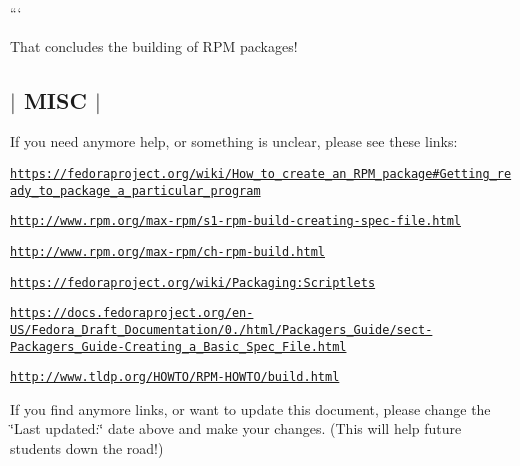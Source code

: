 ```

That concludes the building of R\-P\-M packages! 

 \subsection*{$\vert$ M\-I\-S\-C $\vert$ }

If you need anymore help, or something is unclear, please see these links\-:

\href{https://fedoraproject.org/wiki/How_to_create_an_RPM_package#Getting_ready_to_package_a_particular_program}{\tt https\-://fedoraproject.\-org/wiki/\-How\-\_\-to\-\_\-create\-\_\-an\-\_\-\-R\-P\-M\-\_\-package\#\-Getting\-\_\-ready\-\_\-to\-\_\-package\-\_\-a\-\_\-particular\-\_\-program}

\href{http://www.rpm.org/max-rpm/s1-rpm-build-creating-spec-file.html}{\tt http\-://www.\-rpm.\-org/max-\/rpm/s1-\/rpm-\/build-\/creating-\/spec-\/file.\-html}

\href{http://www.rpm.org/max-rpm/ch-rpm-build.html}{\tt http\-://www.\-rpm.\-org/max-\/rpm/ch-\/rpm-\/build.\-html}

\href{https://fedoraproject.org/wiki/Packaging:Scriptlets}{\tt https\-://fedoraproject.\-org/wiki/\-Packaging\-:\-Scriptlets}

\href{https://docs.fedoraproject.org/en-US/Fedora_Draft_Documentation/0.1/html/Packagers_Guide/sect-Packagers_Guide-Creating_a_Basic_Spec_File.html}{\tt https\-://docs.\-fedoraproject.\-org/en-\/\-U\-S/\-Fedora\-\_\-\-Draft\-\_\-\-Documentation/0./html/\-Packagers\-\_\-\-Guide/sect-\/\-Packagers\-\_\-\-Guide-\/\-Creating\-\_\-a\-\_\-\-Basic\-\_\-\-Spec\-\_\-\-File.\-html}

\href{http://www.tldp.org/HOWTO/RPM-HOWTO/build.html}{\tt http\-://www.\-tldp.\-org/\-H\-O\-W\-T\-O/\-R\-P\-M-\/\-H\-O\-W\-T\-O/build.\-html}

If you find anymore links, or want to update this document, please change the \char`\"{}\-Last updated\-:\char`\"{} date above and make your changes. (This will help future students down the road!) 